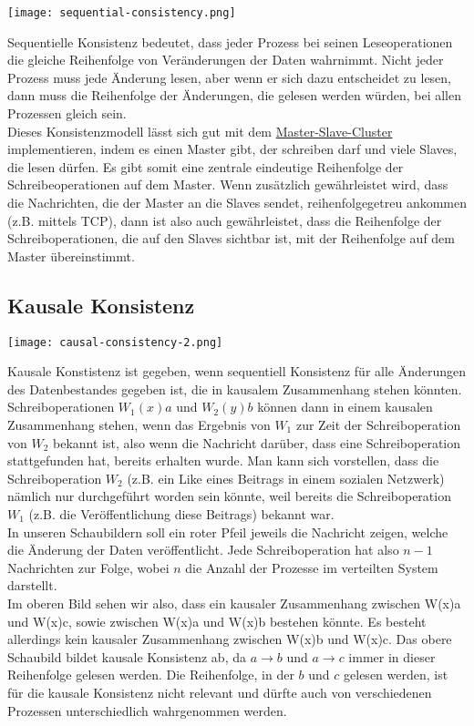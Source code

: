 \texttt{[image: sequential-consistency.png]}

Sequentielle Konsistenz bedeutet, dass jeder Prozess bei seinen Leseoperationen die gleiche Reihenfolge von Veränderungen der Daten wahrnimmt. Nicht jeder Prozess muss jede Änderung lesen, aber wenn er sich dazu entscheidet zu lesen, dann muss die Reihenfolge der Änderungen, die gelesen werden würden, bei allen Prozessen gleich sein. \\
Dieses Konsistenzmodell lässt sich gut mit dem \hyperref[sec:master-slave]{Master-Slave-Cluster} implementieren, indem es einen Master gibt, der schreiben darf und viele Slaves, die lesen dürfen. Es gibt somit eine zentrale eindeutige Reihenfolge der Schreibeoperationen auf dem Master. Wenn zusätzlich gewährleistet wird, dass die Nachrichten, die der Master an die Slaves sendet, reihenfolgegetreu ankommen (z.B. mittels TCP), dann ist also auch gewährleistet, dass die Reihenfolge der Schreiboperationen, die auf den Slaves sichtbar ist, mit der Reihenfolge auf dem Master übereinstimmt.

\subsection{Kausale Konsistenz}

\texttt{[image: causal-consistency-2.png]}

Kausale Konstistenz ist gegeben, wenn sequentiell Konsistenz für alle Änderungen des Datenbestandes gegeben ist, die in kausalem Zusammenhang stehen könnten. Schreiboperationen $W_{1}(x)a$ und $W_{2}(y)b$ können dann in einem kausalen Zusammenhang stehen, wenn das Ergebnis von $W_{1}$ zur Zeit der Schreiboperation von $W_{2}$ bekannt ist, also wenn die Nachricht darüber, dass eine Schreiboperation stattgefunden hat, bereits erhalten wurde. Man kann sich vorstellen, dass die Schreiboperation $W_{2}$ (z.B. ein Like eines Beitrags in einem sozialen Netzwerk) nämlich nur durchgeführt worden sein könnte, weil bereits die Schreiboperation $W_{1}$ (z.B. die Veröffentlichung diese Beitrags) bekannt war. \\

In unseren Schaubildern soll ein roter Pfeil jeweils die Nachricht zeigen, welche die Änderung der Daten veröffentlicht. Jede Schreiboperation hat also $n-1$ Nachrichten zur Folge, wobei $n$ die Anzahl der Prozesse im verteilten System darstellt.\\
Im oberen Bild sehen wir also, dass ein kausaler Zusammenhang zwischen W(x)a und W(x)c, sowie zwischen W(x)a und W(x)b bestehen könnte. Es besteht allerdings kein kausaler Zusammenhang zwischen W(x)b und W(x)c. Das obere Schaubild bildet kausale Konsistenz ab, da $a \rightarrow b $ und $a \rightarrow c$ immer in dieser Reihenfolge gelesen werden. Die Reihenfolge, in der $b$ und $c$ gelesen werden, ist für die kausale Konsistenz nicht relevant und dürfte auch von verschiedenen Prozessen unterschiedlich wahrgenommen werden. \\


